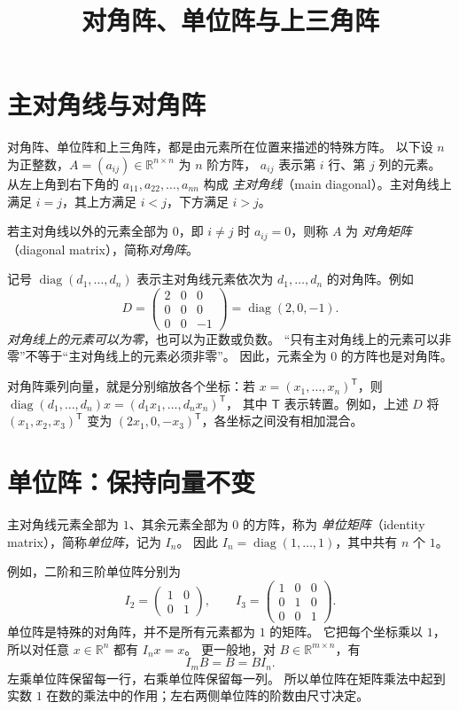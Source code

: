\documentclass[UTF8,12pt,a4paper,fontset=fandol]{ctexart}
\title{对角阵、单位阵与上三角阵}
\author{}
\date{}
\begin{document}
\maketitle

\section{主对角线与对角阵}

对角阵、单位阵和上三角阵，都是由元素所在位置来描述的特殊方阵。
以下设 $n$ 为正整数，$A=(a_{ij})\in\mathbb R^{n\times n}$ 为 $n$ 阶方阵，
$a_{ij}$ 表示第 $i$ 行、第 $j$ 列的元素。
从左上角到右下角的 $a_{11},a_{22},\ldots,a_{nn}$ 构成
\emph{主对角线}（main diagonal）。主对角线上满足 $i=j$，其上方满足 $i<j$，下方满足 $i>j$。

\begin{definition}[对角阵]
若主对角线以外的元素全部为 $0$，即 $i\ne j$ 时 $a_{ij}=0$，则称 $A$ 为
\emph{对角矩阵}（diagonal matrix），简称\emph{对角阵}。
\end{definition}

记号 $\operatorname{diag}(d_1,\ldots,d_n)$ 表示主对角线元素依次为 $d_1,\ldots,d_n$ 的对角阵。例如
\[
  D=\begin{pmatrix}2&0&0\\0&0&0\\0&0&-1\end{pmatrix}
   =\operatorname{diag}(2,0,-1).
\]
\emph{对角线上的元素可以为零}，也可以为正数或负数。
“只有主对角线上的元素可以非零”不等于“主对角线上的元素必须非零”。
因此，元素全为 $0$ 的方阵也是对角阵。

对角阵乘列向量，就是分别缩放各个坐标：若 $x=(x_1,\ldots,x_n)^{\mathsf T}$，则
$\operatorname{diag}(d_1,\ldots,d_n)x=(d_1x_1,\ldots,d_nx_n)^{\mathsf T}$，
其中 $\mathsf T$ 表示转置。例如，上述 $D$ 将 $(x_1,x_2,x_3)^{\mathsf T}$ 变为
$(2x_1,0,-x_3)^{\mathsf T}$，各坐标之间没有相加混合。

\section{单位阵：保持向量不变}

\begin{definition}[单位阵]
主对角线元素全部为 $1$、其余元素全部为 $0$ 的方阵，称为
\emph{单位矩阵}（identity matrix），简称\emph{单位阵}，记为 $I_n$。
因此 $I_n=\operatorname{diag}(1,\ldots,1)$，其中共有 $n$ 个 $1$。
\end{definition}

例如，二阶和三阶单位阵分别为
\[
  I_2=\begin{pmatrix}1&0\\0&1\end{pmatrix},\qquad
  I_3=\begin{pmatrix}1&0&0\\0&1&0\\0&0&1\end{pmatrix}.
\]
单位阵是特殊的对角阵，并不是所有元素都为 $1$ 的矩阵。
它把每个坐标乘以 $1$，所以对任意 $x\in\mathbb R^n$ 都有 $I_nx=x$。
更一般地，对 $B\in\mathbb R^{m\times n}$，有
\[
  I_mB=B=BI_n.
\]
左乘单位阵保留每一行，右乘单位阵保留每一列。
所以单位阵在矩阵乘法中起到实数 $1$ 在数的乘法中的作用；左右两侧单位阵的阶数由尺寸决定。
\end{document}
